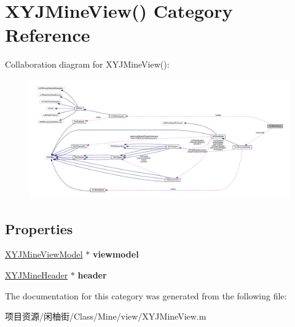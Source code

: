 \hypertarget{category_x_y_j_mine_view_07_08}{}\section{X\+Y\+J\+Mine\+View() Category Reference}
\label{category_x_y_j_mine_view_07_08}


Collaboration diagram for X\+Y\+J\+Mine\+View()\+:\nopagebreak
\begin{figure}[H]
\begin{center}
\leavevmode
\includegraphics[width=350pt]{category_x_y_j_mine_view_07_08__coll__graph}
\end{center}
\end{figure}
\subsection*{Properties}
\begin{DoxyCompactItemize}
\item 
\mbox{\label{category_x_y_j_mine_view_07_08_a397b4b36d119641a161c6276be454b6e}} 
\mbox{\hyperlink{interface_x_y_j_mine_view_model}{X\+Y\+J\+Mine\+View\+Model}} $\ast$ {\bfseries viewmodel}
\item 
\mbox{\label{category_x_y_j_mine_view_07_08_aaa3acbcd8c63a84ff37ca8f57b67da36}} 
\mbox{\hyperlink{interface_x_y_j_mine_header}{X\+Y\+J\+Mine\+Header}} $\ast$ {\bfseries header}
\end{DoxyCompactItemize}


The documentation for this category was generated from the following file\+:\begin{DoxyCompactItemize}
\item 
项目资源/闲柚街/\+Class/\+Mine/view/X\+Y\+J\+Mine\+View.\+m\end{DoxyCompactItemize}
